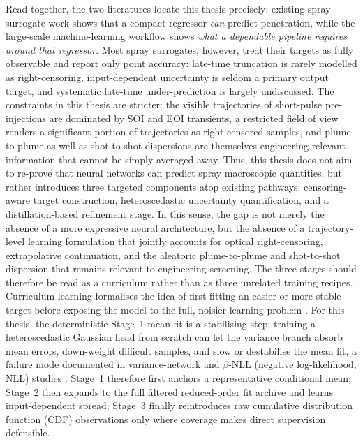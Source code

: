 Read together, the two literatures locate this thesis precisely: existing spray surrogate work shows that a compact regressor \emph{can} predict penetration, while the large-scale machine-learning workflow shows \emph{what a dependable pipeline requires around that regressor}. Most spray surrogates, however, treat their targets as fully observable and report only point accuracy: late-time truncation is rarely modelled as right-censoring, input-dependent uncertainty is seldom a primary output target, and systematic late-time under-prediction is largely undiscussed.
The constraints in this thesis are stricter:
the visible trajectories of short-pulse pre-injections are dominated by SOI and EOI transients, a restricted field of view renders a significant portion of trajectories as right-censored samples, and plume-to-plume as well as shot-to-shot dispersions are themselves engineering-relevant information that cannot be simply averaged away.
Thus, this thesis does not aim to re-prove that neural networks can predict spray macroscopic quantities, but rather introduces three targeted components atop existing pathways:
censoring-aware target construction, heteroscedastic uncertainty quantification, and a distillation-based refinement stage.
In this sense, the gap is not merely the absence of a more expressive neural architecture, but the absence of a trajectory-level learning formulation that jointly accounts for optical right-censoring, extrapolative continuation, and the aleatoric plume-to-plume and shot-to-shot dispersion that remains relevant to engineering screening.
The three stages should therefore be read as a curriculum rather than as three unrelated training recipes.
Curriculum learning formalises the idea of first fitting an easier or more stable target before exposing the model to the full, noisier learning problem \cite{BengioCurriculumLearning2009}.
For this thesis, the deterministic Stage~1 mean fit is a stabilising step: training a heteroscedastic Gaussian head from scratch can let the variance branch absorb mean errors, down-weight difficult samples, and slow or destabilise the mean fit, a failure mode documented in variance-network and \(\beta\)-NLL (negative log-likelihood, NLL) studies \cite{Detlefsen2019VarianceNetworks,Seitzer2022PitfallsHeteroscedastic}.
Stage~1 therefore first anchors a representative conditional mean; Stage~2 then expands to the full filtered reduced-order fit archive and learns input-dependent spread; Stage~3 finally reintroduces raw cumulative distribution function (CDF) observations only where coverage makes direct supervision defensible.

